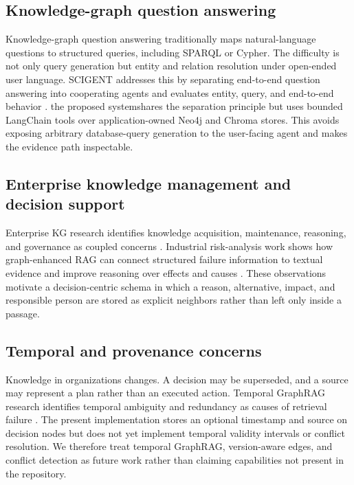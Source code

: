 \documentclass[conference]{IEEEtran}
\newcommand{\system}{the proposed system}
\begin{document}
\subsection{Knowledge-graph question answering}
Knowledge-graph question answering traditionally maps natural-language questions to structured queries, including SPARQL or Cypher. The difficulty is not only query generation but entity and relation resolution under open-ended user language. SCIGENT addresses this by separating end-to-end question answering into cooperating agents and evaluates entity, query, and end-to-end behavior \cite{nguyen2025scigent}. \system shares the separation principle but uses bounded LangChain tools over application-owned Neo4j and Chroma stores. This avoids exposing arbitrary database-query generation to the user-facing agent and makes the evidence path inspectable.

\subsection{Enterprise knowledge management and decision support}
Enterprise KG research identifies knowledge acquisition, maintenance, reasoning, and governance as coupled concerns \cite{schneider2024enterprise,barros2024empwr}. Industrial risk-analysis work shows how graph-enhanced RAG can connect structured failure information to textual evidence and improve reasoning over effects and causes \cite{bahr2025fmea}. These observations motivate a decision-centric schema in which a reason, alternative, impact, and responsible person are stored as explicit neighbors rather than left only inside a passage.

\subsection{Temporal and provenance concerns}
Knowledge in organizations changes. A decision may be superseded, and a source may represent a plan rather than an executed action. Temporal GraphRAG research identifies temporal ambiguity and redundancy as causes of retrieval failure \cite{li2025tgrag}. The present implementation stores an optional timestamp and source on decision nodes but does not yet implement temporal validity intervals or conflict resolution. We therefore treat temporal GraphRAG, version-aware edges, and conflict detection as future work rather than claiming capabilities not present in the repository.
\end{document}
